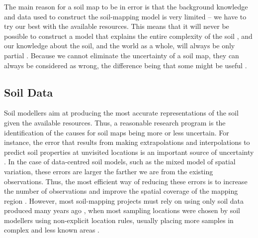 The main reason for a soil map to be in error is that the background knowledge and data used to
construct the soil-mapping model is very limited -- we have to try our best with the available
resources. This means that it will never be possible to construct a model that explains the entire complexity 
of the soil \cite{Tukey1997}, and our knowledge about the soil, and the world as a whole,
will always be only partial \cite{Box1993}. Because we cannot eliminate the uncertainty of a soil
map, they can always be considered as wrong, the difference being that some might be useful
\cite{Box1976}.

\subsection{Soil Data}

Soil modellers aim at producing the most accurate representations of the soil given the
available resources. Thus, a reasonable research program is the identification of the causes for
soil maps being more or less uncertain. For instance, the error that results from making
extrapolations and interpolations to predict soil properties at unvisited locations is an
important source of uncertainty \cite{HeuvelinkEtAl1999, RefsgaardEtAl2006}. In the case of
data-centred soil models, such as the mixed model of spatial variation, these errors are
larger the farther we are from the existing observations. Thus, the most efficient way of reducing
these errors is to increase the number of observations and improve the spatial coverage of the mapping
region \cite{BrusEtAl2007a}. However, most soil-mapping projects must rely on using only soil
data produced many years ago \cite{KempenEtAl2009, HenglEtAl2014, PoggioEtAl2014, 
NussbaumEtAl2014, MulderEtAl2016}, when most sampling locations were chosen by soil 
modellers using non-explicit location rules, usually placing more samples in complex and
less known areas \cite{Rossiter2000}.

